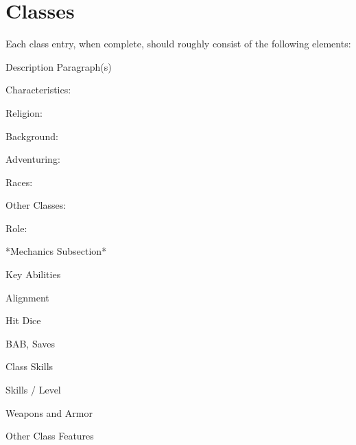 \chapter{Classes}

Each class entry, when complete, should roughly consist of the following elements:

Description Paragraph(s)

Characteristics:

Religion:

Background:

Adventuring:

Races:

Other Classes:

Role:

*Mechanics Subsection*

Key Abilities

Alignment

Hit Dice

BAB, Saves

Class Skills

Skills / Level

Weapons and Armor

Other Class Features


























